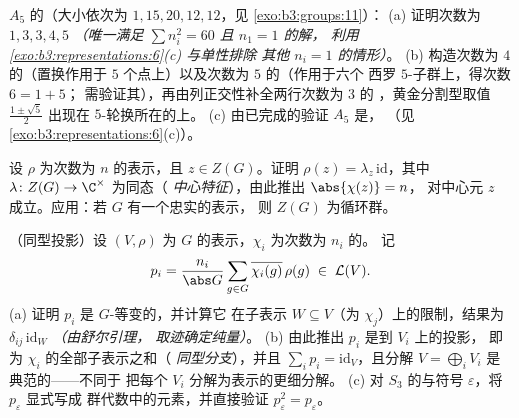 \begin{exercise}[$\star\star\star$]\label{exo:b3:representations:9}
$A_5$ 的（大小依次为 $1, 15, 20, 12,
12$，见 \cref{exo:b3:groups:11}）：
(a) 证明次数为 $1, 3, 3, 4, 5$ \emph{（唯一满足 $\sum n_i^2 = 60$
且 $n_1 = 1$ 的解，
利用 \cref{exo:b3:representations:6}(c) 与单性排除
其他 $n_i = 1$ 的情形）}。
(b) 构造次数为 $4$ 的（置换作用于
$5$ 个点上）以及次数为 $5$ 的（作用于六个
西罗 $5$-子群上，得次数 $6 = 1 + 5$；
需验证其），再由列正交性补全两行次数为 $3$ 的
，黄金分割型取值 $\frac{1\pm\sqrt5}2$ 出现在
$5$-轮换所在的上。
(c) 由已完成的验证 $A_5$ 是，
（见 \cref{exo:b3:representations:6}(c)）。
\end{exercise}

\begin{exercise}[$\star\star$]\label{exo:b3:representations:10}
设 $\rho$ 为次数为 $n$ 的表示，且 $z
\in Z(G)$。证明 $\rho(z) = \lambda_z\,\mathrm{id}$，其中
$\lambda \colon Z(G) \to \C^\times$ 为同态（
\emph{中心特征}），由此推出 $\abs{\chi(z)} = n$，
对中心元 $z$ 成立。应用：若 $G$ 有一个忠实的表示，
则 $Z(G)$ 为循环群。
\end{exercise}

\begin{exercise}[$\star\star$]\label{exo:b3:representations:11}
（同型投影）设 $(V, \rho)$ 为
$G$ 的表示，$\chi_i$ 为次数为 $n_i$ 的。
记
\[
p_i = \frac{n_i}{\abs G}\sum_{g\in G}
\overline{\chi_i(g)}\,\rho(g) \;\in\; \mathcal L(V).
\]
(a) 证明 $p_i$ 是 $G$-等变的，并计算它
在子表示 $W \subseteq
V$（为 $\chi_j$）上的限制，结果为 $\delta_{ij}\,
\mathrm{id}_W$ \emph{（由舒尔引理，
取迹确定纯量）}。
(b) 由此推出 $p_i$ 是到 $V_i$ 上的投影，
即为 $\chi_i$ 的全部子表示之和（
\emph{同型分支}），并且 $\sum_ip_i =
\mathrm{id}_V$，且分解 $V =
\bigoplus_iV_i$ 是典范的——不同于
把每个 $V_i$ 分解为表示的更细分解。
(c) 对 $S_3$ 的与符号
 $\varepsilon$，将 $p_\varepsilon$ 显式写成
群代数中的元素，并直接验证 $p_\varepsilon^2
= p_\varepsilon$。
\end{exercise}

